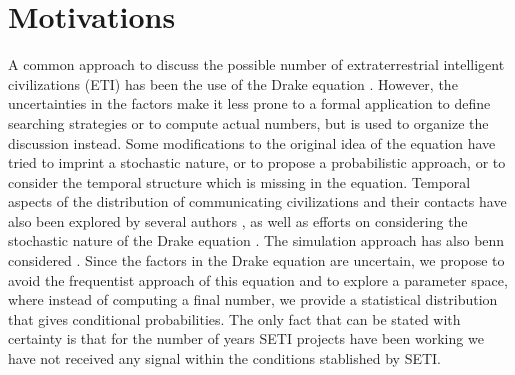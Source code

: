 \documentclass[crop]{CSLB}%
\begin{document}




\maketitle

\Fpagebreak



\section{Motivations}\label{S_motivations}

A common approach to discuss the possible number of extraterrestrial
intelligent civilizations (ETI) has been the use of the Drake equation
\citep{Gleiser2010, Prantzos2013, Haqq-Misra2017}.
%
However, the uncertainties in the factors make it less prone to a
formal application to define searching strategies or to compute
actual numbers, but is used to organize the discussion instead.
%
Some modifications to the original idea of the equation have tried to
imprint a stochastic nature, or to propose a probabilistic approach,
or to consider the temporal structure which is missing in the
equation.
%
Temporal aspects of the distribution of communicating civilizations
and their contacts have also been explored by several authors
\citep{Fogg1987, Forgan2011, Balbi2018},
%
as well as efforts on considering the stochastic nature of the Drake equation
\citep{Glade2011}.
%
The simulation approach has also benn considered
\citep{Forgan2008, Forgan2010}.
%
Since the factors in the Drake equation are uncertain, we propose to
avoid the frequentist approach of this equation
and to explore a parameter space, where instead of computing a final
number, we provide a statistical distribution that gives conditional
probabilities.
%
The only fact that can be stated with certainty is that for the number
of years SETI projects have been working we have not received any
signal within the conditions stablished by SETI.
\end{document}

